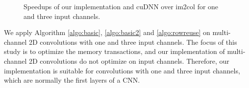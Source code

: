 \begin{figure}
\centering
	

\caption{Speedups of our implementation and cuDNN over im2col for one and three input channels.}
\label{fig:multi2druntime}
\end{figure}


We apply Algorithm \ref{algo:basic}, \ref{algo:basic2} and \ref{algo:rowreuse} on multi-channel 2D convolutions with one and three input channels. The focus of this study is to optimize the memory transactions, and our implementation of multi-channel 2D convolutions do not optimize on input channels. Therefore, our implementation is suitable for convolutions with one and three input channels, which are normally the first layers of a CNN.

